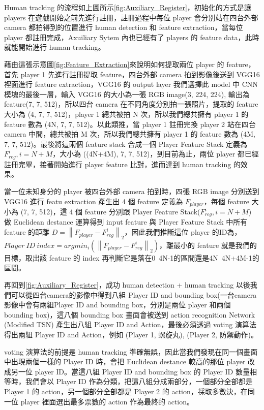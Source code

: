 Human tracking 的流程如上圖所示\ref{fig:Auxiliary_Register}，初始化的方式是讓 players 在遊戲開始之前先進行註冊，註冊過程中每位 player 會分別站在四台外部 camera 都拍得到的位置進行 human detection 和 feature extraction，當每位 player 都註冊完成，Axuiliary Sytem 內也已經有了 players 的 feature data，此時就能開始進行 human tracking。


藉由這張示意圖\ref{fig:Feature_Extraction}來說明如何提取兩位 player 的 feature，首先 player 1 先進行註冊提取 feature，四台外部 camera 拍到影像後送到 VGG16 裡面進行 feature extraction，VGG16 的 output layer 我們選擇此 model 中 CNN 模塊的最後一層，輸入 VGG16 的大小為一張 RGB image(3, 224, 224), 輸出為 feature(7, 7, 512)，所以四台 camera 在不同角度分別拍一張照片，提取的 feature 大小為 (4, 7, 7, 512)，player 1 總共被拍 N 次，所以我們總共擁有 player 1 的 feature 數為 (4N, 7, 7, 512)。以此類推，當 player 1 註冊完換 player 2 站在四台 camera 中間，總共被拍 M 次，所以我們總共擁有 player 1 的 feature 數為 (4M, 7, 7, 512)。最後將這兩個 feature stack 合成一個 Player Feature Stack 定義為 $F_{reg}^i, i=N+M$，大小為 ((4N+4M), 7, 7, 512)，到目前為止，兩位 player 都已經註冊完畢，接著開始進行 player feature 比對，進而達到 human tracking 的效果。

當一位未知身分的 player 被四台外部 camera 拍到時，四張 RGB image 分別送到 VGG16 進行 featu extraction 產生出 4 個 feature 定義為 $F_{player}$，每個 feature 大小為 (7, 7, 512)，這 4 個 feature 分別跟 Player Feature Stack($F_{reg}^i, i=N+M$) 做 Euclidean destance 運算得到 input feature 與 Player Feature Stack 中所有 feature 的距離 $D=\left \| F_{player}-F_{reg}^i \right \|_2$，因此我們推斷這位 player 的ID為，$Player\ ID\ index=argmin_i(\left \| F_{player}-F_{reg}^i \right \|_2)$，離最小的 feature 就是我們的目標，取出該 feature 的 index 再判斷它是落在0~4N-1的區間還是4N~4N+4M-1的區間。

再回到\ref{fig:Auxiliary_Register}，成功 human detection + human tracking 以後我們可以從四台camera的影像中得到八組 Player ID and bounding box(一台camera影像中會有兩組Player ID and bounding box，分別是兩位 player 和兩個 bounding box)，這八個 bounding box 畫面會被送到 action recognition Network (Modified TSN) 產生出八組 Player ID and Action，最後必須透過 voting 演算法得出兩組 Player ID and Action，例如 (Player 1, 螺旋丸), (Player 2, 防禦動作)。

voting 演算法的前提是 human tracking 準確無誤，因此當我們發現在同一個畫面中出現兩個一樣的 Player ID 時，會把 Euclidean destance 較高的那位 player 改成另一位 player ID。當這八組 Player ID and bounding box 的 Player ID 數量相等時，我們會以 Player ID 作為分類，把這八組分成兩部分，一個部分全部都是 Player 1 的 action，另一個部分全部都是 Player 2 的 action，採取多數決，在同一位 player 裡面選出最多票數的 action 作為最終的 action。

\EndChapter
